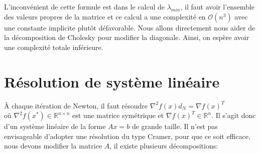 L'inconv\'enient de cette formule est dans le calcul de $\lambda_{min}$, il faut avoir l'ensemble des valeurs propres de
la matrice et ce calcul a une complexit\'e en $\mathcal{O}(n^3)$ avec une constante implicite plutôt d\'efavorable.
Nous allons directement nous aider de la d\'ecomposition de Cholesky pour modifier la diagonale. Ainsi, on esp\`ere avoir
une complexit\'e totale inf\'erieure.





\section{R\'esolution de syst\`eme lin\'eaire}
\`A chaque it\'eration de Newton, il faut r\'esoudre $\nabla^2 f(x)d_N=\nabla f(x)^T$\\ o\`u $\nabla^2 f(x^*)\in \mathbb{R}^{n\times n}$
 est une matrice sym\'etrique et $\nabla f(x)^T \in \mathbb{R}^n$.
Il s'agit donc d'un syst\`eme lin\'eaire de la forme $Ax=b$ de grande taille. Il n'est pas envisageable
d'adopter une r\'esolution du type Cramer, pour que ce soit efficace, nous devons
 modifier la matrice $A$, il existe plusieurs d\'ecompositions:
